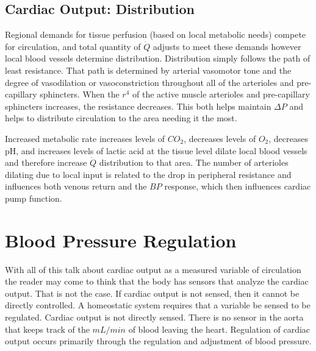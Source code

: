 \subsection{Cardiac Output: Distribution}

Regional demands for tissue perfusion (based on local metabolic needs) compete for circulation, and total quantity of $\dot{Q}$ adjusts to meet these demands however local blood vessels determine distribution. Distribution simply follows the path of least resistance. That path is determined by arterial vasomotor tone and the degree of vasodilation or vasoconstriction throughout all of the arterioles and pre-capillary sphincters. When the $r^4$ of the active muscle arterioles and pre-capillary sphincters increases, the resistance decreases. This both helps maintain $\Delta P$ and helps to distribute circulation to the area needing it the most.

Increased metabolic rate increases levels of $CO_2$, decreases levels of $O_2$, decreases pH, and increases levels of lactic acid at the tissue level dilate local blood vessels and therefore increase $\dot{Q}$ distribution to that area. The number of arterioles dilating due to local input is related to the drop in peripheral resistance and influences both venous return and the $BP$ response, which then influences cardiac pump function. 

\section{Blood Pressure Regulation}

With all of this talk about cardiac output as a measured variable of circulation the reader may come to think that the body has sensors that analyze the cardiac output. That is not the case. If cardiac output is not sensed, then it cannot be directly controlled. A homeostatic system requires that a variable be sensed to be regulated. Cardiac output is not directly sensed. There is no sensor in the aorta that keeps track of the $mL/min$ of blood leaving the heart. Regulation of cardiac output occurs primarily through the regulation and adjustment of blood pressure. 

